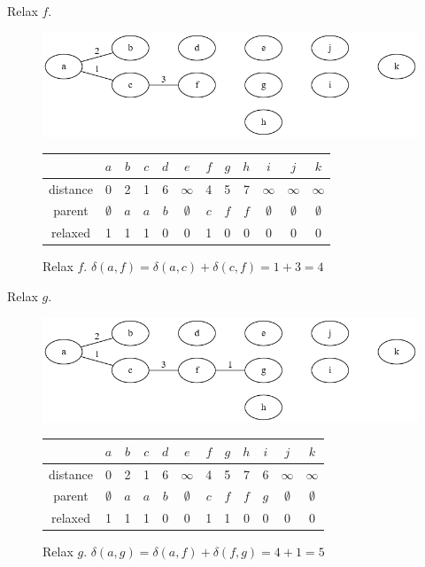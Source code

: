 \documentclass{book}
\begin{document}
Relax $f$.

\begin{figure}[H]
\centering
\includegraphics[width=.75\textwidth]{ch-dijkstra/spf4}
  \begin{tabular}{ | c | c | c | c | c | c | c | c | c | c | c | c | }
  \hline
   & $a$ & $b$ & $c$ & $d$ & $e$ & $f$ & $g$ & $h$ & $i$ & $j$ & $k$ \\
   \hline
   distance & 0 & 2 & 1 & 6 & $\infty$ & 4 & 5 & 7 & $\infty$ & $\infty$ & $\infty$ \\
   \hline
   parent & $\emptyset$ & $a$ & $a$ & $b$ & $\emptyset$ & $c$ & $f$ & $f$ & $\emptyset$ & $\emptyset$ & $\emptyset$ \\
   \hline
   relaxed & 1 & 1 & 1 & 0 & 0 & 1 & 0 & 0 & 0 & 0 & 0 \\
   \hline
  \end{tabular}
\caption{Relax $f$. $\delta(a,f)=\delta(a,c)+\delta(c,f)=1+3=4$}
\label{spf4}
\end{figure}

Relax $g$.

\begin{figure}[H]
\centering
\includegraphics[width=.75\textwidth]{ch-dijkstra/spf5}
  \begin{tabular}{ | c | c | c | c | c | c | c | c | c | c | c | c | }
  \hline
   & $a$ & $b$ & $c$ & $d$ & $e$ & $f$ & $g$ & $h$ & $i$ & $j$ & $k$ \\
   \hline
   distance & 0 & 2 & 1 & 6 & $\infty$ & 4 & 5 & 7 & 6 & $\infty$ & $\infty$ \\
   \hline
   parent & $\emptyset$ & $a$ & $a$ & $b$ & $\emptyset$ & $c$ & $f$ & $f$ & $g$ & $\emptyset$ & $\emptyset$ \\
   \hline
   relaxed & 1 & 1 & 1 & 0 & 0 & 1 & 1 & 0 & 0 & 0 & 0 \\
   \hline
  \end{tabular}
\caption{Relax $g$. $\delta(a,g) = \delta(a,f) + \delta(f,g) = 4+1=5$}
\label{spf5}
\end{figure}
\end{document}
